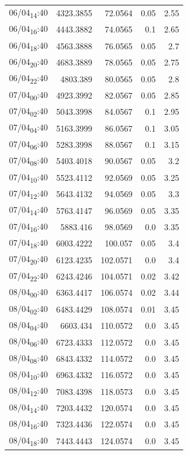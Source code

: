 \documentclass[11pt]{article}
\begin{document}
\begin{center}
\begin{tabular}{lrrrr}
06/04\textsubscript{14}:40 & 4323.3855 & 72.0564 & 0.05 & 2.55\\[0pt]
06/04\textsubscript{16}:40 & 4443.3882 & 74.0565 & 0.1 & 2.65\\[0pt]
06/04\textsubscript{18}:40 & 4563.3888 & 76.0565 & 0.05 & 2.7\\[0pt]
06/04\textsubscript{20}:40 & 4683.3889 & 78.0565 & 0.05 & 2.75\\[0pt]
06/04\textsubscript{22}:40 & 4803.389 & 80.0565 & 0.05 & 2.8\\[0pt]
07/04\textsubscript{00}:40 & 4923.3992 & 82.0567 & 0.05 & 2.85\\[0pt]
07/04\textsubscript{02}:40 & 5043.3998 & 84.0567 & 0.1 & 2.95\\[0pt]
07/04\textsubscript{04}:40 & 5163.3999 & 86.0567 & 0.1 & 3.05\\[0pt]
07/04\textsubscript{06}:40 & 5283.3998 & 88.0567 & 0.1 & 3.15\\[0pt]
07/04\textsubscript{08}:40 & 5403.4018 & 90.0567 & 0.05 & 3.2\\[0pt]
07/04\textsubscript{10}:40 & 5523.4112 & 92.0569 & 0.05 & 3.25\\[0pt]
07/04\textsubscript{12}:40 & 5643.4132 & 94.0569 & 0.05 & 3.3\\[0pt]
07/04\textsubscript{14}:40 & 5763.4147 & 96.0569 & 0.05 & 3.35\\[0pt]
07/04\textsubscript{16}:40 & 5883.416 & 98.0569 & 0.0 & 3.35\\[0pt]
07/04\textsubscript{18}:40 & 6003.4222 & 100.057 & 0.05 & 3.4\\[0pt]
07/04\textsubscript{20}:40 & 6123.4235 & 102.0571 & 0.0 & 3.4\\[0pt]
07/04\textsubscript{22}:40 & 6243.4246 & 104.0571 & 0.02 & 3.42\\[0pt]
08/04\textsubscript{00}:40 & 6363.4417 & 106.0574 & 0.02 & 3.44\\[0pt]
08/04\textsubscript{02}:40 & 6483.4429 & 108.0574 & 0.01 & 3.45\\[0pt]
08/04\textsubscript{04}:40 & 6603.434 & 110.0572 & 0.0 & 3.45\\[0pt]
08/04\textsubscript{06}:40 & 6723.4333 & 112.0572 & 0.0 & 3.45\\[0pt]
08/04\textsubscript{08}:40 & 6843.4332 & 114.0572 & 0.0 & 3.45\\[0pt]
08/04\textsubscript{10}:40 & 6963.4332 & 116.0572 & 0.0 & 3.45\\[0pt]
08/04\textsubscript{12}:40 & 7083.4398 & 118.0573 & 0.0 & 3.45\\[0pt]
08/04\textsubscript{14}:40 & 7203.4432 & 120.0574 & 0.0 & 3.45\\[0pt]
08/04\textsubscript{16}:40 & 7323.4436 & 122.0574 & 0.0 & 3.45\\[0pt]
08/04\textsubscript{18}:40 & 7443.4443 & 124.0574 & 0.0 & 3.45\\[0pt]
\end{tabular}
\end{center}
\end{document}
